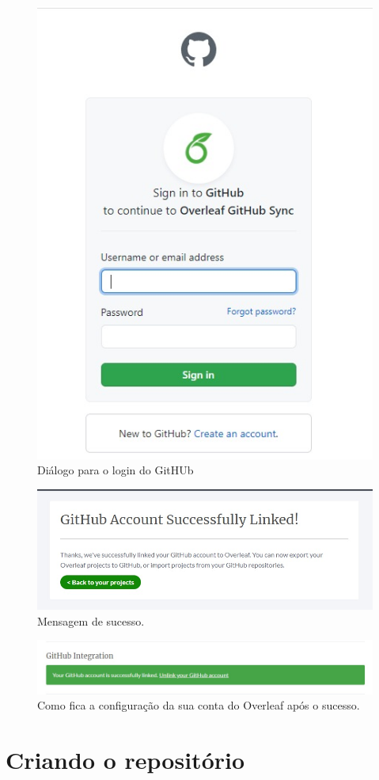 \documentclass{article}
\begin{document}
\begin{figure}
    \centering
    \includegraphics[width=0.6\linewidth]{g11.jpeg}
    \caption{Diálogo para o login do GitHUb}
    \label{fig:g11}
\end{figure}

\begin{figure}
    \centering
    \includegraphics[width=0.9\linewidth]{g2.jpeg}
    \caption{Mensagem de sucesso.}
    \label{fig:g2}
\end{figure}

\begin{figure}
    \centering
    \includegraphics[width=0.9\linewidth]{g3.jpeg}
    \caption{Como fica a configuração da sua conta do Overleaf após o sucesso.}
    \label{fig:g3}
\end{figure}


\section{Criando o repositório}
\end{document}
